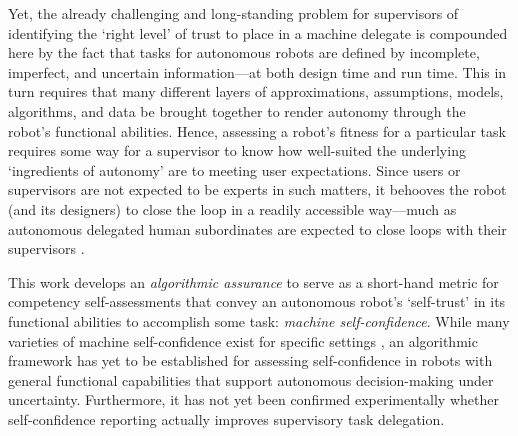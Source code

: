 Yet, the already challenging and long-standing problem for supervisors of identifying the `right level' of trust to place in a machine delegate \cite{Muir1994-ow} is compounded here by the fact that tasks for autonomous robots are defined by incomplete, imperfect, and uncertain information---at both design time and run time. This in turn requires that many different layers of approximations, assumptions, models, algorithms, and data be brought together to render autonomy through the robot's functional abilities. Hence, assessing a robot's fitness for a particular task requires some way for a supervisor to know how well-suited the underlying `ingredients of autonomy' are to meeting user expectations. Since users or supervisors are not expected to be experts in such matters, it behooves the robot (and its designers) to close the loop in a readily accessible way---much as autonomous delegated human subordinates are expected to close loops with their supervisors \cite{Miller2014-av}. 

This work develops an \emph{algorithmic assurance} \cite{Israelsen2019-to} to serve as a short-hand metric for competency self-assessments that convey an autonomous robot's `self-trust' in its functional abilities to accomplish some task: \emph{machine self-confidence}. While many varieties of machine self-confidence exist for specific settings \cite{Hutchins2015-if, Kuter2015-qh,Sweet2016-tz,  Zagorecki2015-qy}, an algorithmic framework has yet to be established for assessing self-confidence in robots with general functional capabilities that support autonomous decision-making under uncertainty. Furthermore, it has not yet been confirmed experimentally whether self-confidence reporting actually improves supervisory task delegation. %

